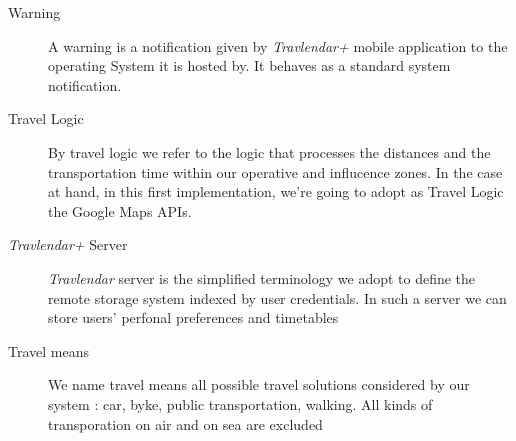 \begin{description}
				\item[Warning] A warning is a notification given by \textit{Travlendar+} mobile application to the operating System it is hosted by. It behaves as a standard system notification.
				\item[Travel Logic] By travel logic we refer to the logic that processes the distances and the transportation time within our operative and influcence zones. In the case at hand, in this first implementation, we're going to adopt as Travel Logic the Google Maps APIs.
				\item [\textit{Travlendar+} Server] \textit{Travlendar} server is the simplified terminology we adopt to define the remote storage system indexed by user credentials. In such a server we can store users' perfonal preferences and timetables  
				\item [Travel means] We name travel means all possible travel solutions considered by our system : car, byke, public transportation, walking. All kinds of transporation on air and on sea are excluded
\end{description}
